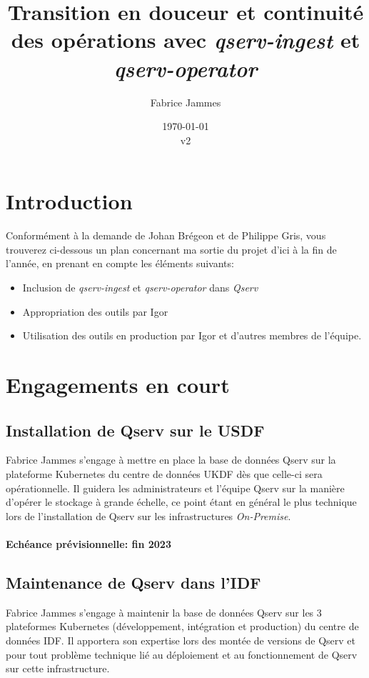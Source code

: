 \documentclass[french] {article}
\title{Transition en douceur et continuité des opérations avec \textit{qserv-ingest} et \textit{qserv-operator}}
\author{Fabrice Jammes}
\date{\today\\v2}
\begin{document}
\maketitle

\section{Introduction}

Conformément à la demande de Johan Brégeon et de Philippe Gris, vous trouverez ci-dessous un plan concernant ma sortie du projet d'ici à la fin de l'année, en prenant en compte les éléments suivants:

\begin{itemize}
\item Inclusion de \textit{qserv-ingest} et \textit{qserv-operator} dans \textit{Qserv}
\item Appropriation des outils par Igor
\item Utilisation des outils en production par Igor et d'autres membres de l'équipe.
\end{itemize}

\section{Engagements en court}

\subsection{Installation de Qserv sur le USDF}

Fabrice Jammes s'engage à mettre en place la base de données Qserv sur la plateforme Kubernetes du centre de données UKDF dès que celle-ci sera opérationnelle. Il guidera les administrateurs et l'équipe
Qserv sur la manière d'opérer le stockage à grande échelle, ce point étant en général le plus technique lors de l'installation de Qserv sur les infrastructures \textit{On-Premise}.

\paragraph{Echéance prévisionnelle: fin 2023}

\subsection{Maintenance de Qserv dans l'IDF}

Fabrice Jammes s'engage à maintenir la base de données Qserv sur les 3 plateformes Kubernetes (développement, intégration et production) du centre de données IDF. Il apportera son expertise lors des montée de versions de Qserv et pour tout problème technique lié au déploiement et au fonctionnement de Qserv sur cette infrastructure.
\end{document}

